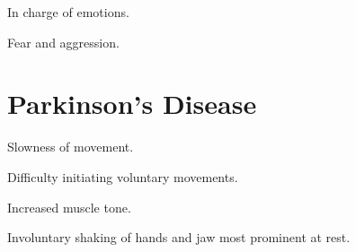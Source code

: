 \begin{coloredlist}
\begin{coloredlist}
\begin{coloredlist}
            \item {}
            \begin{coloredlist}
                \item In charge of emotions.
                \item Fear and aggression.
            \end{coloredlist}
            \item {}
            \item {}
            \item {}
            \item {}
        \end{coloredlist}
        \item {}
        \item {}
    \end{coloredlist}
\end{coloredlist}


\hypertarget{parkinson}{}
\section{Parkinson's Disease}
\begin{coloredlist}
    \item {}
    \begin{coloredlist}
        \item Slowness of movement.
    \end{coloredlist}
    \item {}
    \begin{coloredlist}
        \item Difficulty initiating voluntary movements.
    \end{coloredlist}
    \item {}
    \begin{coloredlist}
        \item Increased muscle tone.
    \end{coloredlist}
    \item {}
    \begin{coloredlist}
        \item Involuntary shaking of hands and jaw most prominent at rest.
    \end{coloredlist}
\end{coloredlist}


